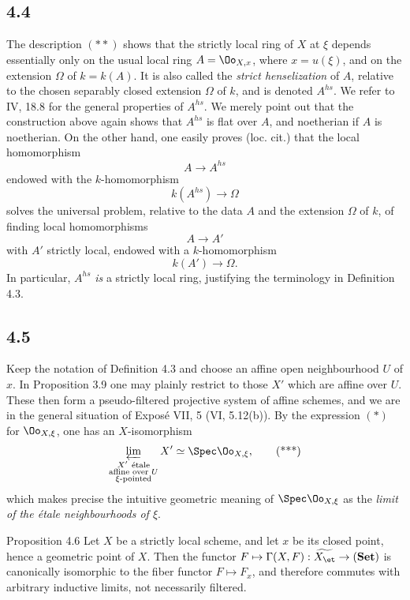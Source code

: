 \subsection*{4.4}
The description \((**)\) shows that the strictly local ring of \(X\) at \(\xi\) depends essentially only on the usual local ring \(A=\Oo_{X,x}\), where \(x=u(\xi)\), and on the extension \(\Omega\) of \(k=k(A)\). It is also called the \emph{strict henselization} of \(A\), relative to the chosen separably closed extension \(\Omega\) of \(k\), and is denoted \(A^{hs}\). We refer to \EGA{} IV, 18.8 for the general properties of \(A^{hs}\). We merely point out that the construction above again shows that \(A^{hs}\) is flat over \(A\), and noetherian if \(A\) is noetherian. On the other hand, one easily proves (loc. cit.) that the local homomorphism
\[
A\longrightarrow A^{hs}
\]
endowed with the \(k\)-homomorphism
\[
k(A^{hs})\longrightarrow \Omega
\]
solves the universal problem, relative to the data \(A\) and the extension \(\Omega\) of \(k\), of finding local homomorphisms
\[
A\longrightarrow A'
\]
with \(A'\) strictly local, endowed with a \(k\)-homomorphism
\[
k(A')\longrightarrow \Omega.
\]
In particular, \(A^{hs}\) \emph{is} a strictly local ring, justifying the terminology in Definition 4.3.

\subsection*{4.5}
Keep the notation of Definition 4.3 and choose an affine open neighbourhood \(U\) of \(x\). In Proposition 3.9 one may plainly restrict to those \(X'\) which are affine over \(U\). These then form a pseudo-filtered projective system of affine schemes, and we are in the general situation of Expos\'e VII, 5 (\cf VI, 5.12(b)). By the expression \((*)\) for \(\Oo_{X,\xi}\), one has an \(X\)-isomorphism
\[
\varprojlim_{\substack{X'\ \text{\'etale}\\ \text{affine over }U\\ \xi\text{-pointed}}}X'
\simeq \Spec \Oo_{X,\xi},
\tag{***}
\]
which makes precise the intuitive geometric meaning of \(\Spec\Oo_{X,\xi}\) as the \emph{limit of the \'etale neighbourhoods of \(\xi\)}.

\begin{statement}{Proposition 4.6}
Let \(X\) be a strictly local scheme, and let \(x\) be its closed point, hence a geometric point of \(X\). Then the functor \(F\mapsto\Gamma(X,F):\widetilde{X_{\et}}\to(\mathbf{Set})\) is canonically isomorphic to the fiber functor \(F\mapsto F_x\), and therefore commutes with arbitrary inductive limits, not necessarily filtered.
\end{statement}

